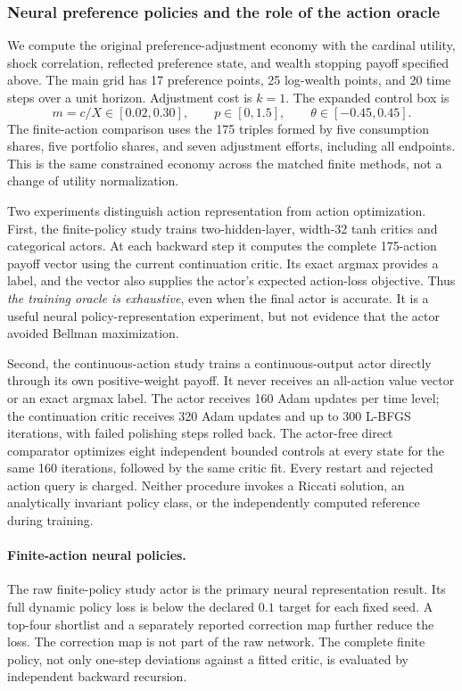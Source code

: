 \documentclass[ecta,nameyear,draft]{econsocart}
\theoremstyle{definition}
\theoremstyle{remark}
\begin{document}
\subsubsection{Neural preference policies and the role of the action oracle}\label{sec:ndu-neural}
We compute the original preference-adjustment economy with the cardinal utility, shock correlation, reflected preference state, and wealth stopping payoff specified above. The main grid has 17 preference points, 25 log-wealth points, and 20 time steps over a unit horizon. Adjustment cost is $k=1$. The expanded control box is
\[
 m=c/X\in[0.02,0.30],\qquad p\in[0,1.5],\qquad\theta\in[-0.45,0.45].
\]
The finite-action comparison uses the 175 triples formed by five consumption shares, five portfolio shares, and seven adjustment efforts, including all endpoints. This is the same constrained economy across the matched finite methods, not a change of utility normalization.

Two experiments distinguish action representation from action optimization. First, the finite-policy study trains two-hidden-layer, width-32 tanh critics and categorical actors. At each backward step it computes the complete 175-action payoff vector using the current continuation critic. Its exact argmax provides a label, and the vector also supplies the actor's expected action-loss objective. Thus \emph{the training oracle is exhaustive}, even when the final actor is accurate. It is a useful neural policy-representation experiment, but not evidence that the actor avoided Bellman maximization.

Second, the continuous-action study trains a continuous-output actor directly through its own positive-weight payoff. It never receives an all-action value vector or an exact argmax label. The actor receives 160 Adam updates per time level; the continuation critic receives 320 Adam updates and up to 300 L-BFGS iterations, with failed polishing steps rolled back. The actor-free direct comparator optimizes eight independent bounded controls at every state for the same 160 iterations, followed by the same critic fit. Every restart and rejected action query is charged. Neither procedure invokes a Riccati solution, an analytically invariant policy class, or the independently computed reference during training.

\paragraph*{Finite-action neural policies.}
The raw finite-policy study actor is the primary neural representation result. Its full dynamic policy loss is below the declared $0.1$ target for each fixed seed. A top-four shortlist and a separately reported correction map further reduce the loss. The correction map is not part of the raw network. The complete finite policy, not only one-step deviations against a fitted critic, is evaluated by independent backward recursion.
\end{document}
